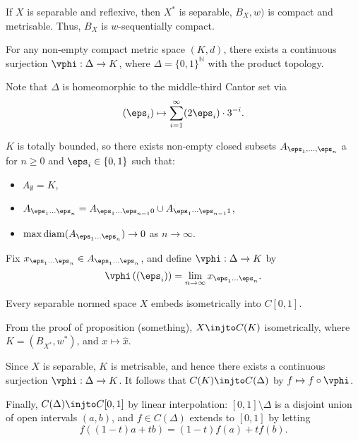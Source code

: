 \documentclass[12pt]{article}
\begin{document}
\begin{remark}
	If $X$ is separable and reflexive, then $X^{\ast}$ is separable, $B_X, w)$ is compact and metrisable. Thus, $B_X$ is $w$-sequentially compact.
\end{remark}

\begin{lemma}
	For any non-empty compact metric space $(K, d)$, there exists a continuous surjection $\vphi : \Delta \to K$, where $\Delta = \{0, 1\}^{\mathbb{N}}$ with the product topology.
\end{lemma}

Note that $\Delta$ is homeomorphic to the middle-third Cantor set via
\[
	(\eps_i) \mapsto \sum_{i = 1}^{\infty} (2 \eps_i) \cdot 3^{-i}.
\]

\begin{proofbox}
	$K$ is totally bounded, so there exists non-empty closed subsets $A_{\eps_1, \ldots, \eps_n}$ a for $n \geq 0$ and $\eps_i \in \{0, 1\}$ such that:
	\begin{itemize}
		\item $A_{\emptyset} = K$, 
		\item $A_{\eps_1 \ldots \eps_n} = A_{\eps_1 \ldots \eps_{n-1} 0} \cup A_{\eps_1 \cdots \eps_{n-1} 1}$,
		\item $\max \mathrm{diam} (A_{\eps_1 \ldots \eps_n}) \to 0$ as $n \to \infty$.
	\end{itemize}
	Fix $x_{\eps_1 \ldots \eps_n} \in A_{\eps_1 \ldots \eps_n}$, and define $\vphi : \Delta \to K$ by
	\[
	\vphi \left( (\eps_i) \right) = \lim_{n \to \infty} x_{\eps_1 \ldots \eps_n}.
	\]
\end{proofbox}

\begin{theorem}
	Every separable normed space $X$ embeds isometrically into $C[0, 1]$.
\end{theorem}

\begin{proofbox}
	From the proof of proposition (something), $X \injto C(K)$ isometrically, where $K = (B_{X^{\ast}}, w^{\ast})$, and $x \mapsto \hat x$.

	Since $X$ is separable, $K$ is metrisable, and hence there exists a continuous surjection $\vphi : \Delta \to K$. It follows that $C(K) \injto C(\Delta)$ by $f \mapsto f \circ \vphi$.

	Finally, $C(\Delta) \injto C[0, 1]$ by linear interpolation: $[0, 1] \setminus \Delta$ is a disjoint union of open intervals $(a, b)$, and $f \in C(\Delta)$ extends to $[0, 1]$ by letting
	\[
	f((1 - t)a + tb) = (1 - t)f(a) + tf(b).
	\]
\end{proofbox}
\end{document}
